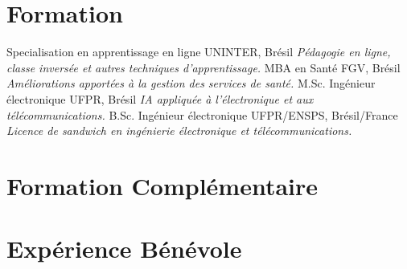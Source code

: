 \documentclass[letterpaper]{twentysecondcv_fr} %
\begin{document}
\section{Formation}

\begin{twenty} %
						{Specialisation en apprentissage en ligne}
						{UNINTER, Brésil}
						{\emph{Pédagogie en ligne, classe inversée et autres techniques 
						d'apprentissage.}}
						{MBA en Santé}
						{FGV, Brésil}
						{\emph{Améliorations apportées à la gestion des services de santé.}}
						{M.Sc. Ingénieur électronique}
						{UFPR, Brésil}
						{\emph{IA appliquée à l'électronique et aux télécommunications.}}
						{B.Sc. Ingénieur électronique}
						{UFPR/ENSPS, Brésil/France}
						{\emph{Licence de sandwich en ingénierie électronique et 
						télécommunications.}}
\end{twenty}


\section{Formation Complémentaire}

\begin{twenty} %
\end{twenty}


\section{Expérience Bénévole}
\end{document}
